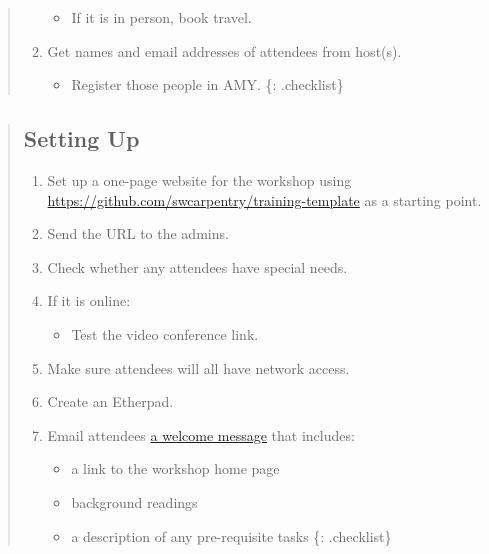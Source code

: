 \begin{quote}
\begin{enumerate}
  \begin{itemize}
  \itemsep1pt\parskip0pt
  \item
    If it is in person, book travel.
  \end{itemize}
\item
  Get names and email addresses of attendees from host(s).

  \begin{itemize}
  \itemsep1pt\parskip0pt
  \item
    Register those people in AMY. \{: .checklist\}
  \end{itemize}
\end{enumerate}
\end{quote}

\begin{quote}
\subsection{Setting Up}\label{setting-up}

\begin{enumerate}
\def\labelenumi{\arabic{enumi}.}
\itemsep1pt\parskip0pt
\item
  Set up a one-page website for the workshop using
  \url{https://github.com/swcarpentry/training-template} as a starting
  point.
\item
  Send the URL to the admins.
\item
  Check whether any attendees have special needs.
\item
  If it is online:

  \begin{itemize}
  \itemsep1pt\parskip0pt
  \item
    Test the video conference link.
  \end{itemize}
\item
  Make sure attendees will all have network access.
\item
  Create an Etherpad.
\item
  Email attendees
  \href{\{\{\%20page.root\%20\}\}/files/messages/welcome.txt}{a welcome
  message} that includes:

  \begin{itemize}
  \itemsep1pt\parskip0pt
  \item
    a link to the workshop home page
  \item
    background readings
  \item
    a description of any pre-requisite tasks \{: .checklist\}
  \end{itemize}
\end{enumerate}
\end{quote}

